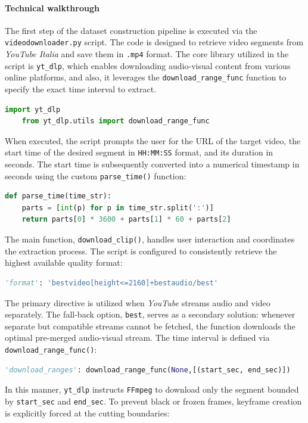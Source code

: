 \paragraph{Technical walkthrough} The first step of the dataset construction pipeline is executed via the \texttt{videodownloader.py}\cite{deodati2026maiaav} script. The code is designed to retrieve video segments from \textit{YouTube Italia} and save them in \texttt{.mp4} format. The core library utilized in the script is \texttt{yt\_dlp}, which enables downloading audio-visual content from various online platforms, and also, it leverages the \texttt{download\_range\_func} function to specify the exact time interval to extract.
\begin{lstlisting}[language=Python]
    import yt_dlp
    from yt_dlp.utils import download_range_func
\end{lstlisting}
When executed, the script prompts the user for the URL of the target video, the start time of the desired segment in \texttt{HH:MM:SS} format, and its duration in seconds. The start time is subsequently converted into a numerical timestamp in seconds using the custom \texttt{parse\_time()} function:
\begin{lstlisting}[language=Python]
    def parse_time(time_str):
    parts = [int(p) for p in time_str.split(':')]
    return parts[0] * 3600 + parts[1] * 60 + parts[2]
\end{lstlisting}
The main function, \texttt{download\_clip()}, handles user interaction and coordinates the extraction process.
The script is configured to consistently retrieve the highest available quality format:
\begin{lstlisting}[language=Python]
    'format': 'bestvideo[height<=2160]+bestaudio/best'
\end{lstlisting}
The primary directive is utilized when \textit{YouTube} streams audio and video separately. The fall-back option, \texttt{best}, serves as a secondary solution: whenever separate but compatible streams cannot be fetched, the function downloads the optimal pre-merged audio-visual stream.
The time interval is defined via \texttt{download\_range\_func()}:
\begin{lstlisting}[language=Python]
    'download_ranges': download_range_func(None,[(start_sec, end_sec)])
\end{lstlisting}
In this manner, \texttt{yt\_dlp} instructs \texttt{FFmpeg} to download only the segment bounded by \texttt{start\_sec} and \texttt{end\_sec}.
To prevent black or frozen frames, keyframe creation is explicitly forced at the cutting boundaries:
